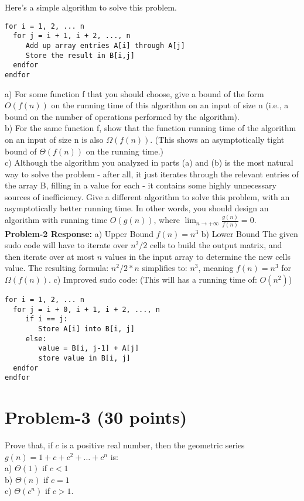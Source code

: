 \documentclass[11pt]{article}
\begin{document}
Here's a simple algorithm to solve this problem.\\
\begin{verbatim}
for i = 1, 2, ... n
  for j = i + 1, i + 2, ..., n
     Add up array entries A[i] through A[j]
     Store the result in B[i,j]
  endfor
endfor
\end{verbatim}
\noindent
a) For some function f that you should choose, give a bound of the form $O(f(n))$ on the running time of this algorithm on an input of size n (i.e., a bound on the number of operations performed by the algorithm).\\
b) For the same function f, show that the function running time of the algorithm on an input of size n is also $\Omega(f(n))$. (This shows an asymptotically tight bound of $\Theta(f(n))$ on the running time.)\\
c) Although the algorithm you analyzed in parts (a) and (b) is the most natural way to solve the problem - after all, it just iterates through the relevant entries of the array B, filling in a value for each - it contains some highly unnecessary sources of inefficiency. Give a different algorithm to solve this problem, with an asymptotically better running time. In other words, you should design an algorithm with running time $O(g(n))$, where $\lim_{n \to +\infty} \frac{g(n)}{f(n)} = 0$.\\


\noindent
{\bf Problem-2 Response:}
\newline
a) Upper Bound
\newline
\indent
$f(n)=n^3$
\bigskip
\newline
b) Lower Bound
\newline
\indent
The given sudo code will have to iterate over $n^2/2$ cells to build the output matrix, and then iterate over at most $n$ values in the input array to determine the new cells value. The resulting formula: $n^2/2 * n$ simplifies to: $n^3$, meaning $f(n)=n^3$ for $\Omega(f(n))$.
\bigskip
\newline
c) Improved sudo code: (This will has a running time of: $O(n^2)$)
\begin{verbatim}
for i = 1, 2, ... n
  for j = i + 0, i + 1, i + 2, ..., n
     if i == j:
        Store A[i] into B[i, j]
     else:
        value = B[i, j-1] + A[j]
        store value in B[i, j]
  endfor
endfor
\end{verbatim}


\newpage
\section*{Problem-3 (30 points)}
Prove that, if $c$ is a positive real number, then the geometric series $g(n)= 1 + c + c^2 + \dots + c^n$ is:\\
a) $\Theta(1)$ if $c<1$\\
b) $\Theta(n)$ if $c=1$\\
c) $\Theta(c^n)$ if $c>1$.\\
\end{document}
